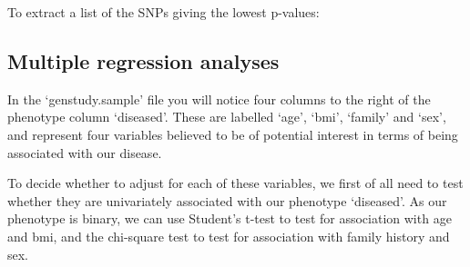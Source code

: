 \documentclass[]{book}
\newenvironment{Shaded}{\begin{snugshade}}{\end{snugshade}}
\newcommand{\KeywordTok}[1]{\textcolor[rgb]{0.13,0.29,0.53}{\textbf{#1}}}
\newcommand{\DataTypeTok}[1]{\textcolor[rgb]{0.13,0.29,0.53}{#1}}
\newcommand{\DecValTok}[1]{\textcolor[rgb]{0.00,0.00,0.81}{#1}}
\newcommand{\StringTok}[1]{\textcolor[rgb]{0.31,0.60,0.02}{#1}}
\newcommand{\CommentTok}[1]{\textcolor[rgb]{0.56,0.35,0.01}{\textit{#1}}}
\newcommand{\FunctionTok}[1]{\textcolor[rgb]{0.00,0.00,0.00}{#1}}
\newcommand{\OperatorTok}[1]{\textcolor[rgb]{0.81,0.36,0.00}{\textbf{#1}}}
\newcommand{\NormalTok}[1]{#1}
\begin{document}
To extract a list of the SNPs giving the lowest p-values:

\begin{Shaded}
\end{Shaded}

\subsection{Multiple regression
analyses}\label{multiple-regression-analyses}

In the `genstudy.sample' file you will notice four columns to the right
of the phenotype column `diseased'. These are labelled `age', `bmi',
`family' and `sex', and represent four variables believed to be of
potential interest in terms of being associated with our disease.

To decide whether to adjust for each of these variables, we first of all
need to test whether they are univariately associated with our phenotype
`diseased'. As our phenotype is binary, we can use Student's t-test to
test for association with age and bmi, and the chi-square test to test
for association with family history and sex.

\begin{Shaded}
\end{Shaded}
\end{document}
